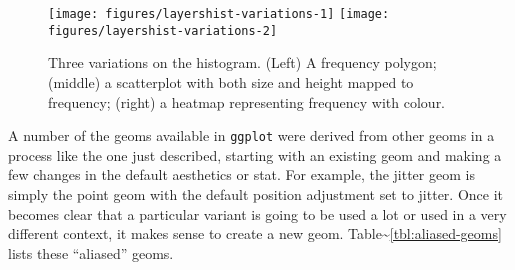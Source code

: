 \begin{Shaded}
\begin{Highlighting}[]
\StringTok{ }\StringTok{ }\NormalTok{(}\NormalTok{, }\NormalTok{)}
\StringTok{ }\NormalTok{(}\NormalTok{(}  \NormalTok{, } \NormalTok{)}
\StringTok{ }\NormalTok{(}\NormalTok{(}  \NormalTok{, } \NormalTok{, }\NormalTok{)}
\end{Highlighting}
\end{Shaded}

\begin{figure}
\texttt{[image: figures/layershist-variations-1]} \texttt{[image: figures/layershist-variations-2]} \caption{Three variations on the histogram. (Left) A frequency polygon; (middle) a scatterplot with both size and height mapped to frequency; (right) a heatmap representing frequency with colour.\label{fig:hist-variations}}
\end{figure}

A number of the geoms available in \texttt{ggplot} were derived from
other geoms in a process like the one just described, starting with an
existing geom and making a few changes in the default aesthetics or
stat. For example, the jitter geom is simply the point geom with the
default position adjustment set to jitter. Once it becomes clear that a
particular variant is going to be used a lot or used in a very different
context, it makes sense to create a new geom.
Table\textasciitilde{}\ref{tbl:aliased-geoms} lists these ``aliased''
geoms. 


